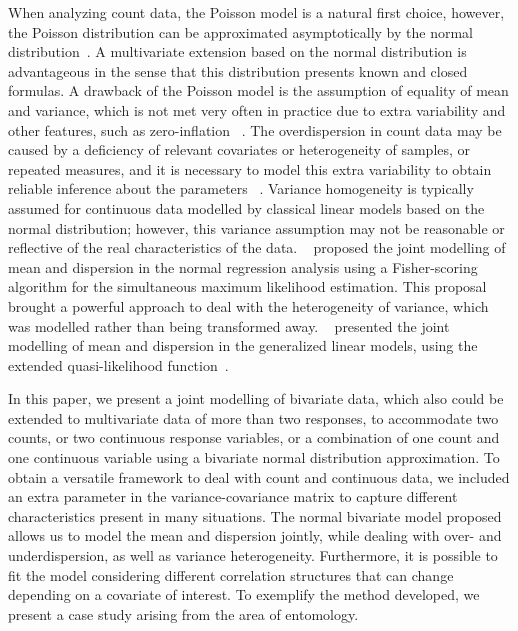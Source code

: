 \documentclass[useAMS,referee]{biom}
\begin{document}
When analyzing count data, the Poisson model is a natural first choice, however, the Poisson distribution can be approximated asymptotically by the normal distribution~\citep{mood1950introduction}. A multivariate extension based on the normal distribution is advantageous in the sense that this distribution presents known and closed formulas.  A drawback of the Poisson model is the assumption of equality of mean and variance, which is not met very often in practice due to extra variability and other features, such as zero-inflation ~\cite{haslett2021modelling}. The overdispersion in count data may be caused by a deficiency of relevant covariates or heterogeneity of samples, or repeated measures, and it is necessary to model this extra variability to obtain reliable inference about the parameters ~\citep{hinde1998overdispersion,ver2007quasi}. Variance homogeneity is typically assumed for continuous data modelled by classical linear models based on the normal distribution; however, this variance assumption may not be reasonable or reflective of the real characteristics of the data. ~\cite{aitkin1987modelling} proposed the joint modelling of mean and dispersion in the normal regression analysis using a Fisher-scoring algorithm for the simultaneous maximum likelihood estimation. This proposal brought a powerful approach to deal with the heterogeneity of variance, which was modelled rather than being transformed away. ~\cite{mccullagh1989generalized} presented the joint modelling of mean and dispersion in the generalized linear models, using the extended quasi-likelihood function~\citep{nelder1987extended}. 





In this paper, we present a joint modelling of bivariate data, which also could be extended to multivariate data of more than two responses, to accommodate two counts, or two continuous response variables, or a combination of one count and one continuous variable using a bivariate normal distribution approximation. To obtain a versatile framework to deal with count and continuous data, we included an extra parameter in the variance-covariance matrix to capture different characteristics present in many situations. The normal bivariate model proposed allows us to model the mean and dispersion jointly, while dealing with over- and underdispersion, as well as variance heterogeneity. Furthermore, it is possible to fit the model considering different correlation structures that can change depending on a covariate of interest. To exemplify the method developed, we present a case study arising from the area of entomology.
\end{document}
